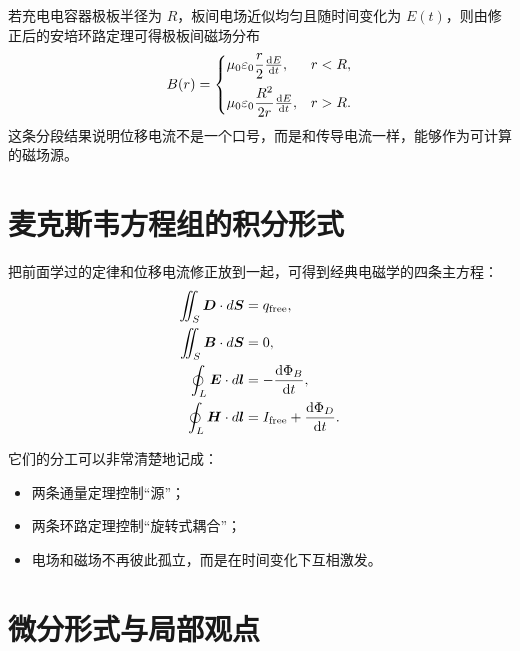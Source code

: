 \documentclass[lang=cn,11pt]{elegantbook}
\begin{document}
\begin{center}
\end{center}

\begin{remark}
若充电电容器极板半径为 \(R\)，板间电场近似均匀且随时间变化为 \(E(t)\)，则由修正后的安培环路定理可得极板间磁场分布
\[
B(r)=
\begin{cases}
\mu_0\varepsilon_0\dfrac{r}{2}\dv{E}{t}, & r<R,\\[8pt]
\mu_0\varepsilon_0\dfrac{R^2}{2r}\dv{E}{t}, & r>R.
\end{cases}
\]
这条分段结果说明位移电流不是一个口号，而是和传导电流一样，能够作为可计算的磁场源。
\end{remark}

\section{麦克斯韦方程组的积分形式}

把前面学过的定律和位移电流修正放到一起，可得到经典电磁学的四条主方程：
\begin{align*}
\iint_S \vb*{D}\cdot d\vb*{S}&=q_{\mathrm{free}},\\
\iint_S \vb*{B}\cdot d\vb*{S}&=0,\\
\oint_L \vb*{E}\cdot d\vb*{l}&=-\dv{\Phi_B}{t},\\
\oint_L \vb*{H}\cdot d\vb*{l}&=I_{\mathrm{free}}+\dv{\Phi_D}{t}.
\end{align*}

它们的分工可以非常清楚地记成：
\begin{itemize}
  \item 两条通量定理控制“源”；
  \item 两条环路定理控制“旋转式耦合”；
  \item 电场和磁场不再彼此孤立，而是在时间变化下互相激发。
\end{itemize}

\section{微分形式与局部观点}
\end{document}
